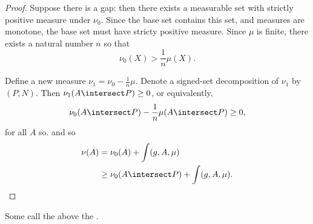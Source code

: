 \begin{prop}
\begin{proof}
  Suppose there is a gap:
  then there exists a measurable
  set with strictly positive measure
  under $\nu_0$.
  Since the base set contains this
  set, and measures are monotone,
  the base set must have stricty
  positive measure.
  Since $\mu$ is finite, there exists
  a natural number $n$ so that
  \[
    \nu_0(X) > \frac{1}{n}\mu(X).
  \]

  Define a new measure $\nu_1 = \nu_0 - \frac{1}{n}\mu$.
  Denote a signed-set decomposition of $\nu_1$
  by $(P, N)$.
  Then $\nu_1(A \intersect P) \geq 0$, or equivalently,
  \[
    \nu_0(A \intersect P) - \frac{1}{n}\mu(A \intersect P) \geq 0,
  \]
  for all $A$ so.
  and so
  \[
    \begin{aligned}
      \nu(A) &=    \nu_0(A) + \int(g, A, \mu) \\
             &\geq \nu_0(A \intersect P) + \int (g, A, \mu).
    \end{aligned}
  \]
\end{proof}
\end{prop}

Some call the above the
.

\strats
